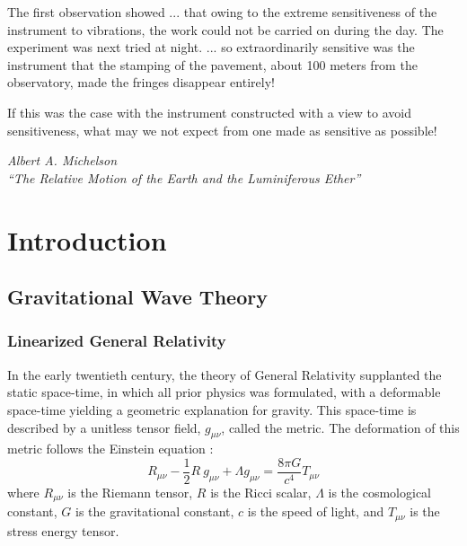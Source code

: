 \documentclass [12pt, proquest]{uwthesis}[2019]
\begin{document}
\textpages
\epigraph{The first observation showed ... that owing to the extreme sensitiveness of the instrument to vibrations, the work could not be carried on during the day. The experiment was next tried at night. ... so extraordinarily sensitive was the instrument that the stamping of the pavement, about 100 meters from the observatory, made the fringes disappear entirely!

If this was the case with the instrument constructed with a view to avoid sensitiveness, what may we not expect from one made as sensitive as possible!}{\textit{Albert A. Michelson \\``The Relative Motion of the Earth and the Luminiferous Ether''}}
\chapter{Introduction}
\section{Gravitational Wave Theory}

\subsection{Linearized General Relativity}

In the early twentieth century, the theory of General Relativity supplanted the static space-time, in which all prior physics was formulated, with a deformable space-time yielding a geometric explanation for gravity. This space-time is described by a unitless tensor field, $g_{\mu \nu}$, called the metric. The deformation of this metric follows the Einstein equation \cite{einsteinGR}:
\begin{equation}
R_{\mu \nu}-\frac{1}{2}R\ g_{\mu \nu}+\Lambda g_{\mu \nu}= \frac{8\pi G}{c^4} T_{\mu \nu}
\end{equation}
where $R_{\mu \nu}$ is the Riemann tensor, $R$ is the Ricci scalar, $\Lambda$ is the cosmological constant, $G$ is the gravitational constant, $c$ is the speed of light, and $T_{\mu \nu}$ is the stress energy tensor.
\end{document}
